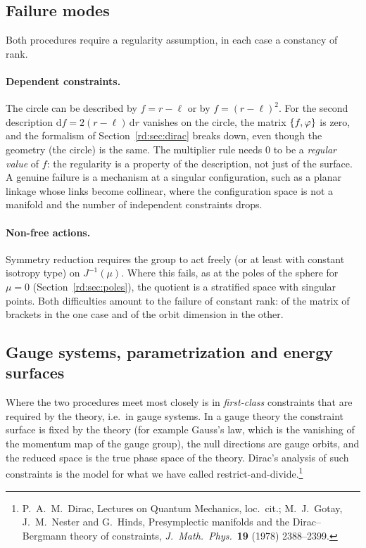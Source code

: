 \subsection{Failure modes}\label{rd:sec:failure}

Both procedures require a regularity assumption, in each case a constancy of rank.

\paragraph{Dependent constraints.} The circle can be described by $f=r-\ell$ or by $f=(r-\ell)^2$. For the second description $\mathrm df=2(r-\ell)\,\mathrm dr$ vanishes on the circle, the matrix $\{f,\varphi\}$ is zero, and the formalism of Section~\ref{rd:sec:dirac} breaks down, even though the geometry (the circle) is the same. The multiplier rule needs $0$ to be a \emph{regular value} of $f$: the regularity is a property of the description, not just of the surface. A genuine failure is a mechanism at a singular configuration, such as a planar linkage whose links become collinear, where the configuration space is not a manifold and the number of independent constraints drops.

\paragraph{Non-free actions.} Symmetry reduction requires the group to act freely (or at least with constant isotropy type) on $J^{-1}(\mu)$. Where this fails, as at the poles of the sphere for $\mu=0$ (Section~\ref{rd:sec:poles}), the quotient is a stratified space with singular points. Both difficulties amount to the failure of constant rank: of the matrix of brackets in the one case and of the orbit dimension in the other.

\subsection{Gauge systems, parametrization and energy surfaces}\label{rd:sec:gauge}

Where the two procedures meet most closely is in \emph{first-class} constraints that are required by the theory, i.e.\ in gauge systems. In a gauge theory the constraint surface is fixed by the theory (for example Gauss's law, which is the vanishing of the momentum map of the gauge group), the null directions are gauge orbits, and the reduced space is the true phase space of the theory. Dirac's analysis of such constraints is the model for what we have called restrict-and-divide.\footnote{P.\ A.\ M.\ Dirac, Lectures on Quantum Mechanics, loc.\ cit.; M.\ J.\ Gotay, J.\ M.\ Nester and G.\ Hinds, Presymplectic manifolds and the Dirac--Bergmann theory of constraints, \emph{J.\ Math.\ Phys.}\ \textbf{19} (1978) 2388--2399.}

